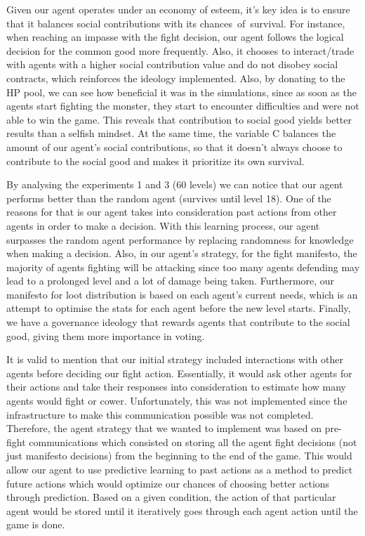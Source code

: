 \newpage

\par Given our agent operates under an economy of esteem, it's key idea is to ensure that it balances social contributions with its chances of survival. For instance, when reaching an impasse with the fight decision, our agent follows the logical decision for the common good more frequently. Also, it chooses to interact/trade with agents with a higher social contribution value and do not disobey social contracts, which reinforces the ideology implemented. Also, by donating to the HP pool, we can see how beneficial it was in the simulations, since as soon as the agents start fighting the monster, they start to encounter difficulties and were not able to win the game. This reveals that contribution to social good yields better results than a selfish mindset. At the same time, the variable C balances the amount of our agent's social contributions, so that it doesn't always choose to contribute to the social good and makes it prioritize its own survival.

\par By analysing the experiments 1 and 3 (60 levels) we can notice that our agent performs better than the random agent (survives until level 18). One of the reasons for that is our agent takes into consideration past actions from other agents in order to make a decision. With this learning process, our agent surpasses the random agent performance by replacing randomness for knowledge when making a decision. Also, in our agent's strategy, for the fight manifesto, the majority of agents fighting will be attacking since too many agents defending may lead to a prolonged level and a lot of damage being taken. Furthermore, our manifesto for loot distribution is based on each agent's current needs, which is an attempt to optimise the stats for each agent before the new level starts. Finally, we have a governance ideology that rewards agents that contribute to the social good, giving them more importance in voting.


\par It is valid to mention that our initial strategy included interactions with other agents before deciding our fight action. Essentially, it would ask other agents for their actions and take their responses into consideration to estimate how many agents would fight or cower. Unfortunately, this was not implemented since the infrastructure to make this communication possible was not completed. Therefore, the agent strategy that we wanted to implement was based on pre-fight communications which consisted on storing all the agent fight decisions (not just manifesto decisions) from the beginning to the end of the game. This would allow our agent to use predictive learning to past actions as a method to predict future actions which would optimize our chances of choosing better actions through prediction. Based on a given condition, the action of that particular agent would be stored until it iteratively goes through each agent action until the game is done.

